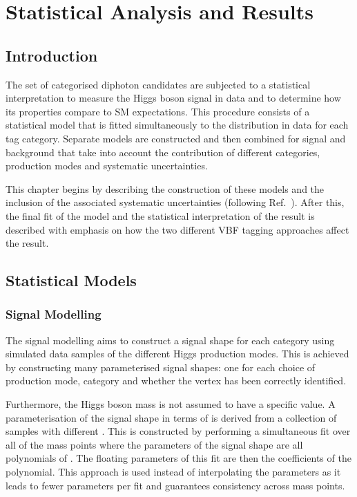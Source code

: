 
\chapter{Statistical Analysis and Results}
\label{chap:statistical}


\section{Introduction}
The set of categorised diphoton candidates are subjected to a statistical interpretation to measure the Higgs boson signal in data and to determine how its properties compare to SM expectations.
This procedure consists of a statistical model that is fitted simultaneously to the \mgg distribution in data for each tag category. 
Separate models are constructed and then combined for signal and background that take into account the contribution of different categories, production modes and systematic uncertainties.

This chapter begins by describing the construction of these models and the inclusion of the associated systematic uncertainties (following Ref.~\cite{HIG-16-040}). 
After this, the final fit of the model and the statistical interpretation of the result is described with emphasis on how the two different VBF tagging approaches affect the result. 


\section{Statistical Models}
\subsection{Signal Modelling}
The signal modelling aims to construct a signal shape for each category using simulated data samples of the different Higgs production modes.
This is achieved by constructing many parameterised signal shapes: one for each choice of production mode, category and whether the vertex has been correctly identified. 

Furthermore, the Higgs boson mass \mH is not assumed to have a specific value. A parameterisation of the signal shape in terms of \mH is derived from a collection of samples with different \mH.
This is constructed by performing a simultaneous fit over all of the mass points where the parameters of the signal shape are all polynomials of \mH. 
The floating parameters of this fit are then the coefficients of the polynomial. 
This approach is used instead of interpolating the parameters as it leads to fewer parameters per fit and guarantees consistency across mass points. 

